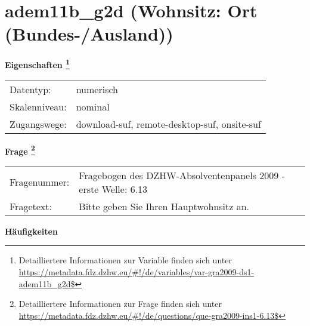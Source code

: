 
    \setcounter{footnote}{0}

    \vspace*{-1.8cm}
	\section{adem11b\_g2d (Wohnsitz: Ort (Bundes-/Ausland))}
	\label{section:adem11b_g2d}



    \vspace*{0.5cm}
    \noindent\textbf{Eigenschaften
	\footnote{Detailliertere Informationen zur Variable finden sich unter
		\url{https://metadata.fdz.dzhw.eu/\#!/de/variables/var-gra2009-ds1-adem11b_g2d$}}}\\
	\begin{tabularx}{\hsize}{@{}lX}
	Datentyp: & numerisch \\
	Skalenniveau: & nominal \\
	Zugangswege: &
	  download-suf, 
	  remote-desktop-suf, 
	  onsite-suf
 \\
    \end{tabularx}



				\vspace*{0.5cm}
                \noindent\textbf{Frage
	                \footnote{Detailliertere Informationen zur Frage finden sich unter
		              \url{https://metadata.fdz.dzhw.eu/\#!/de/questions/que-gra2009-ins1-6.13$}}}\\
				\begin{tabularx}{\hsize}{@{}lX}
					Fragenummer: &
					  Fragebogen des DZHW-Absolventenpanels 2009 - erste Welle:
					  6.13
 \\
					Fragetext: & Bitte geben Sie Ihren Hauptwohnsitz an. \\
				\end{tabularx}





        		\vspace*{0.5cm}
                \noindent\textbf{Häufigkeiten}

